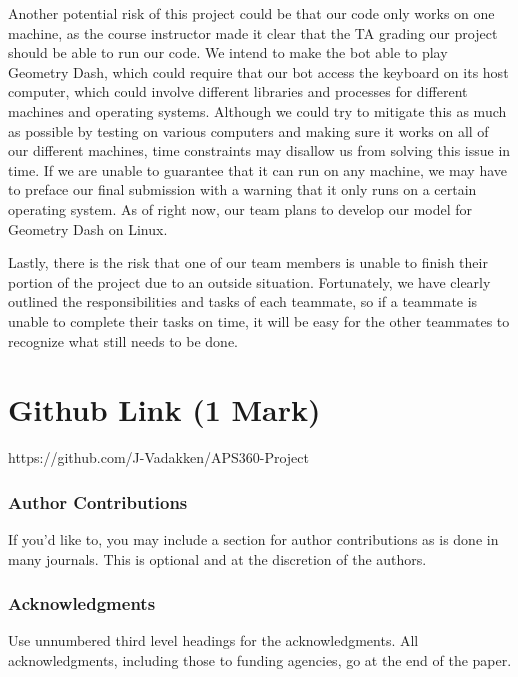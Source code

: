 \documentclass{article} %
\begin{document}
Another potential risk of this project could be that our code only works
on one machine, as the course instructor made it clear that the TA grading
our project should be able to run our code. We intend to make the bot 
able to play Geometry Dash, which could require that our bot access the 
keyboard on its host computer, which could involve different libraries 
and processes for different machines and operating systems. Although 
we could try to mitigate this as much as possible by testing on various 
computers and making sure it works on all of our different machines, time
constraints may disallow us from solving this issue in time. If we are 
unable to guarantee that it can run on any machine, we may have to preface 
our final submission with a warning that it only runs on a certain 
operating system. As of right now, our team plans to develop our model 
for Geometry Dash on Linux. 

Lastly, there is the risk that one of our team members is unable to finish
their portion of the project due to an outside situation. Fortunately, 
we have clearly outlined the responsibilities and tasks of each teammate, 
so if a teammate is unable to complete their tasks on time, it will be 
easy for the other teammates to recognize what still needs to be done.


\section{Github Link (1 Mark)}
https://github.com/J-Vadakken/APS360-Project



\subsubsection*{Author Contributions}
If you'd like to, you may include  a section for author contributions as is done
in many journals. This is optional and at the discretion of the authors.

\subsubsection*{Acknowledgments}
Use unnumbered third level headings for the acknowledgments. All
acknowledgments, including those to funding agencies, go at the end of the paper.

\label{last_page}



\end{document}
